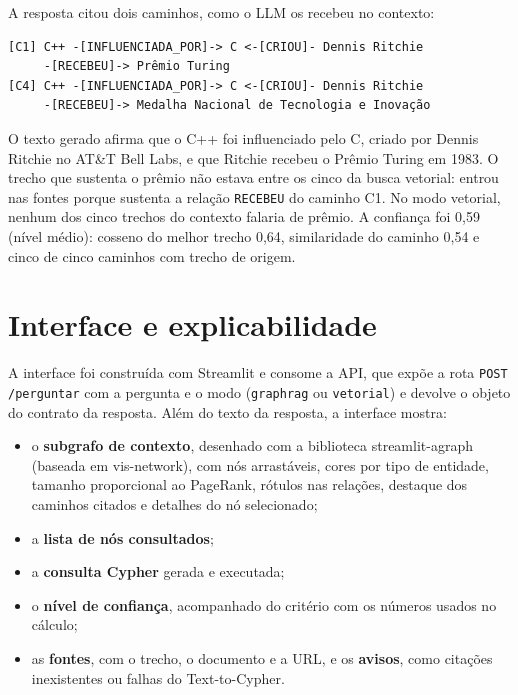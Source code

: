 \documentclass[12pt]{article}
\begin{document}
A resposta citou dois caminhos, como o LLM os recebeu no contexto:

{\small
\begin{verbatim}
[C1] C++ -[INFLUENCIADA_POR]-> C <-[CRIOU]- Dennis Ritchie
     -[RECEBEU]-> Prêmio Turing
[C4] C++ -[INFLUENCIADA_POR]-> C <-[CRIOU]- Dennis Ritchie
     -[RECEBEU]-> Medalha Nacional de Tecnologia e Inovação
\end{verbatim}
}

O texto gerado afirma que o C++ foi influenciado pelo C, criado por Dennis Ritchie no
AT\&T Bell Labs, e que Ritchie recebeu o Prêmio Turing em 1983. O trecho que sustenta o
prêmio não estava entre os cinco da busca vetorial: entrou nas fontes porque sustenta a
relação \texttt{RECEBEU} do caminho C1. No modo vetorial, nenhum dos cinco trechos do
contexto falaria de prêmio. A confiança foi 0,59 (nível médio): cosseno do melhor trecho
0,64, similaridade do caminho 0,54 e cinco de cinco caminhos com trecho de origem.

\section{Interface e explicabilidade}
\label{sec:interface}

A interface foi construída com Streamlit e consome a API, que expõe a rota
\texttt{POST /perguntar} com a pergunta e o modo (\texttt{graphrag} ou \texttt{vetorial}) e
devolve o objeto do contrato da resposta. Além do texto da resposta, a interface mostra:

\begin{itemize}
\item o \textbf{subgrafo de contexto}, desenhado com a biblioteca streamlit-agraph
(baseada em vis-network), com nós arrastáveis, cores por tipo de entidade, tamanho
proporcional ao PageRank, rótulos nas relações, destaque dos caminhos citados e detalhes do
nó selecionado;
\item a \textbf{lista de nós consultados};
\item a \textbf{consulta Cypher} gerada e executada;
\item o \textbf{nível de confiança}, acompanhado do critério com os números usados no
cálculo;
\item as \textbf{fontes}, com o trecho, o documento e a URL, e os \textbf{avisos}, como
citações inexistentes ou falhas do Text-to-Cypher.
\end{itemize}
\end{document}
